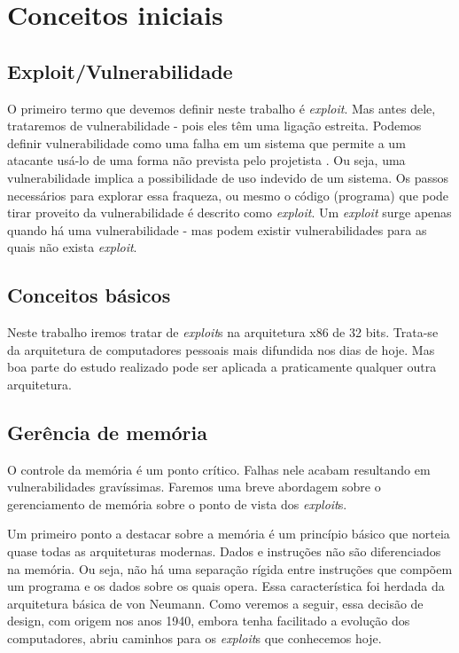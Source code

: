 
\chapter{Conceitos iniciais}
\label{chap:conceitos_iniciais}

	\section{Exploit/Vulnerabilidade}
	O primeiro termo que devemos definir neste trabalho é \textsl{exploit}. Mas antes dele,
	trataremos de vulnerabilidade - pois eles têm uma ligação estreita.
	Podemos definir vulnerabilidade como uma falha em um sistema que permite
	a um atacante usá-lo de uma forma não prevista pelo projetista \cite{Anley2007}.
	Ou seja, uma vulnerabilidade implica a possibilidade de uso indevido de um sistema.
	Os passos necessários para explorar essa fraqueza, ou mesmo o código (programa) que pode tirar
	proveito da vulnerabilidade é descrito como \textsl{exploit}.
	Um \textsl{exploit} surge apenas quando há uma vulnerabilidade - mas podem existir
	vulnerabilidades para as quais não exista \textsl{exploit}.


	\section{Conceitos básicos}
	Neste trabalho iremos tratar de \textsl{exploit}s na arquitetura x86 de 32 bits. Trata-se da arquitetura de computadores
	pessoais mais difundida nos dias de hoje. Mas boa parte do estudo realizado pode ser aplicada
	a praticamente qualquer outra arquitetura.

	\section{Gerência de memória}
	O controle da memória é um ponto crítico. Falhas nele acabam resultando em vulnerabilidades 
	gravíssimas. Faremos uma breve abordagem sobre o gerenciamento de memória sobre
	o ponto de vista dos \textsl{exploit}s.

	Um primeiro ponto a destacar sobre a memória é um princípio básico que norteia
	quase todas as arquiteturas modernas. Dados e instruções não são diferenciados na memória.
	Ou seja, não há uma separação rígida entre instruções que compõem um programa e os dados
	sobre os quais opera. Essa característica foi herdada da arquitetura básica de von Neumann.
	Como veremos a seguir, essa decisão de design, com origem nos anos 1940, embora tenha
	facilitado a evolução dos computadores, abriu caminhos para os \textsl{exploit}s que conhecemos hoje. 

